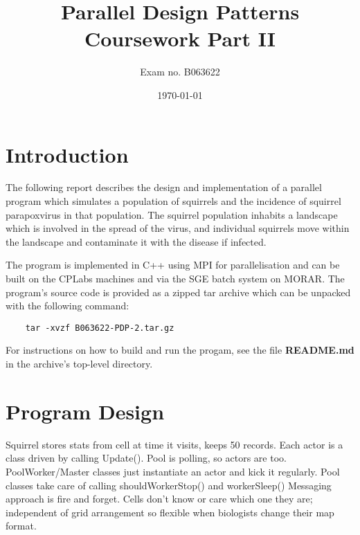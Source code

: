 \documentclass[11pt, oneside]{article}   %
\title{Parallel Design Patterns Coursework Part II}
\author{Exam no. B063622}
\date{\today}
\begin{document}
\maketitle

\newpage

\tableofcontents

\newpage


\section{Introduction}

The following report describes the design and implementation of a parallel program which simulates a population of squirrels and the incidence of squirrel parapoxvirus in that population.
The squirrel population inhabits a landscape which is involved in the spread of the virus, and individual squirrels move within the landscape and contaminate it with the disease if infected.

The program is implemented in C++ using MPI for parallelisation and can be built on the CPLabs machines and via the SGE batch system on MORAR.
The program's source code is provided as a zipped tar archive which can be unpacked with the following command:

\begin{lstlisting}
	tar -xvzf B063622-PDP-2.tar.gz
\end{lstlisting}

For instructions on how to build and run the progam, see the file \textbf{README.md} in the archive's top-level directory.

\newpage

\section{Program Design}
Squirrel stores stats from cell at time it visits, keeps 50 records.
Each actor is a class driven by calling Update().
Pool is polling, so actors are too.
PoolWorker/Master classes just instantiate an actor and kick it regularly.
Pool classes take care of calling shouldWorkerStop() and workerSleep()
Messaging approach is fire and forget.
Cells don't know or care which one they are; independent of grid arrangement so flexible when biologists change their map format.
\end{document}
